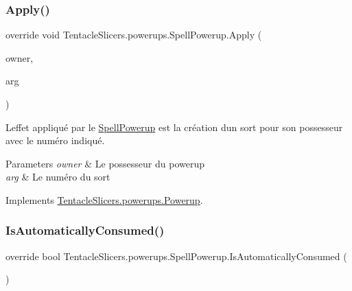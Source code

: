 \subsubsection{\texorpdfstring{Apply()}{Apply()}}
{\footnotesize\ttfamily override void Tentacle\+Slicers.\+powerups.\+Spell\+Powerup.\+Apply (\begin{DoxyParamCaption}\item[{\hyperlink{class_tentacle_slicers_1_1actors_1_1_player_character}{Player\+Character}}]{owner,  }\item[{int}]{arg }\end{DoxyParamCaption})\hspace{0.3cm}{\ttfamily [virtual]}}



L\textquotesingle{}effet appliqué par le \hyperlink{class_tentacle_slicers_1_1powerups_1_1_spell_powerup}{Spell\+Powerup} est la création d\textquotesingle{}un sort pour son possesseur avec le numéro indiqué. 


\begin{DoxyParams}{Parameters}
{\em owner} & Le possesseur du powerup \\
\hline
{\em arg} & Le numéro du sort \\
\hline
\end{DoxyParams}


Implements \hyperlink{class_tentacle_slicers_1_1powerups_1_1_powerup_a64288aa9b1e9f242082be54f1d73f8ba}{Tentacle\+Slicers.\+powerups.\+Powerup}.

\mbox{\label{class_tentacle_slicers_1_1powerups_1_1_spell_powerup_ac1193ef31fbde4059684e65cde3db500}} 
\subsubsection{\texorpdfstring{Is\+Automatically\+Consumed()}{IsAutomaticallyConsumed()}}
{\footnotesize\ttfamily override bool Tentacle\+Slicers.\+powerups.\+Spell\+Powerup.\+Is\+Automatically\+Consumed (\begin{DoxyParamCaption}{ }\end{DoxyParamCaption})\hspace{0.3cm}{\ttfamily [virtual]}}



